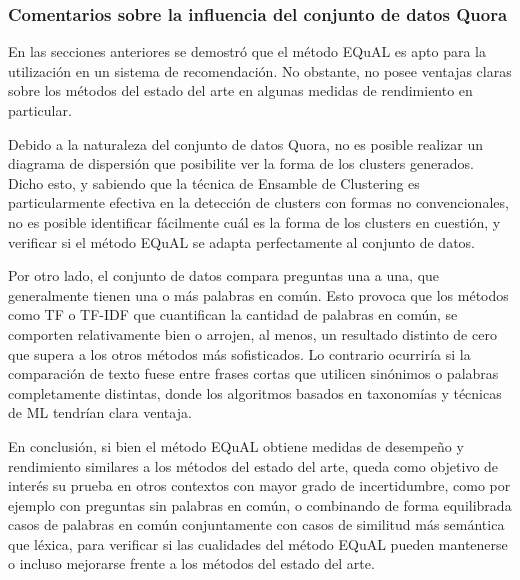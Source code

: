 \subsubsection{Comentarios sobre la influencia del conjunto de datos Quora}
En las secciones anteriores se demostró que el método EQuAL es apto para la utilización en un sistema de recomendación. No obstante, no posee ventajas claras sobre los métodos del estado del arte en algunas medidas de rendimiento en particular.

\bigskip Debido a la naturaleza del conjunto de datos Quora, no es posible realizar un diagrama de dispersión que posibilite ver la forma de los clusters generados. Dicho esto, y sabiendo que la técnica de Ensamble de Clustering es particularmente efectiva en la detección de clusters con formas no convencionales, no es posible identificar fácilmente cuál es la forma de los clusters en cuestión, y verificar si el método EQuAL se adapta perfectamente al conjunto de datos.

\bigskip Por otro lado, el conjunto de datos compara preguntas una a una, que generalmente tienen una o más palabras en común. Esto provoca que los métodos como TF o TF-IDF que cuantifican la cantidad de palabras en común, se comporten relativamente bien o arrojen, al menos, un resultado distinto de cero que supera a los otros métodos más sofisticados. Lo contrario ocurriría si la comparación de texto fuese entre frases cortas que utilicen sinónimos o palabras completamente distintas, donde los algoritmos basados en taxonomías y técnicas de ML tendrían clara ventaja.

\bigskip En conclusión, si bien el método EQuAL obtiene medidas de desempeño y rendimiento similares a los métodos del estado del arte, queda como objetivo de interés su prueba en otros contextos con mayor grado de incertidumbre, como por ejemplo con preguntas sin palabras en común, o combinando de forma equilibrada casos de palabras en común conjuntamente con casos de similitud más semántica que léxica, para verificar si las cualidades del método EQuAL pueden mantenerse o incluso mejorarse frente a los métodos del estado del arte.
